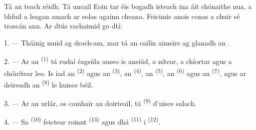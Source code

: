%
%
%

\VUsaut{6.0mm}
\VUsaut{1.4mm}
\VUsaut{0.4mm}
\VUsaut{2.2mm}

Tá an teach réidh. Tá uncail Eoin tar éis bogadh isteach ina áit chónaithe nua, a
bhfuil a leagan amach ar eolas againn cheana. Feicimis anois conas a chuir sé
troscán ann. Ar dtús rachaimid go dtí:

\VUsaut{3.0mm}

1. --- Tháinig muid ag droch-am, mar tá an cailín aimsire ag glanadh an
.

2. --- Ar an  \textsuperscript{(1)} tá rudaí éagsúla anseo
is ansiúd, a nítear, a chíortar agus a chóirítear leo. Is iad an 
\textsuperscript{(2)} agus an  \textsuperscript{(3)}, an
 \textsuperscript{(4)}, an 
\textsuperscript{(5)}, an  \textsuperscript{(6)} agus an
 \textsuperscript{(7)}, agus ar deireadh an 
\textsuperscript{(8)} le huisce béil.

3. --- Ar an urlár, os comhair an doirteail, tá 
\textsuperscript{(9)} d'uisce salach.

4. --- Sa  \textsuperscript{(10)} feictear roinnt 
\textsuperscript{(13)} agus dhá  \textsuperscript{(11)} i
 \textsuperscript{(12)}.

